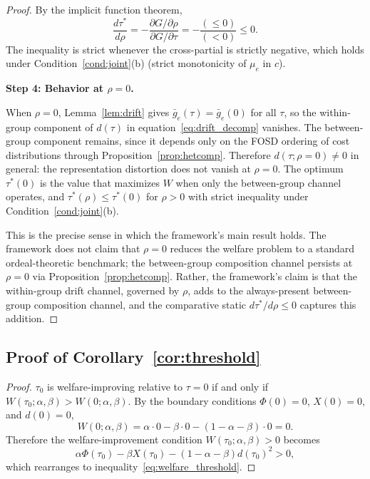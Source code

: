 \begin{proof}
By the implicit function theorem,
\[
\frac{d \tau^*}{d \rho} = -\frac{\partial G/\partial \rho}{\partial G/\partial \tau} = -\frac{(\leq 0)}{(<0)} \leq 0.
\]
The inequality is strict whenever the cross-partial is strictly negative, which holds under Condition~\ref{cond:joint}(b) (strict monotonicity of $\mu_e$ in $c$).

\textbf{Step 4: Behavior at $\rho = 0$.}

When $\rho = 0$, Lemma~\ref{lem:drift} gives $\bar g_e(\tau) = \bar g_e(0)$ for all $\tau$, so the within-group component of $d(\tau)$ in equation~\eqref{eq:drift_decomp} vanishes. The between-group component remains, since it depends only on the FOSD ordering of cost distributions through Proposition~\ref{prop:hetcomp}. Therefore $d(\tau; \rho = 0) \neq 0$ in general: the representation distortion does not vanish at $\rho = 0$. The optimum $\tau^*(0)$ is the value that maximizes $W$ when only the between-group channel operates, and $\tau^*(\rho) \leq \tau^*(0)$ for $\rho > 0$ with strict inequality under Condition~\ref{cond:joint}(b).

This is the precise sense in which the framework's main result holds. The framework does not claim that $\rho = 0$ reduces the welfare problem to a standard ordeal-theoretic benchmark; the between-group composition channel persists at $\rho = 0$ via Proposition~\ref{prop:hetcomp}. Rather, the framework's claim is that the within-group drift channel, governed by $\rho$, adds to the always-present between-group composition channel, and the comparative static $d\tau^*/d\rho \leq 0$ captures this addition.
\end{proof}

\subsection{Proof of Corollary~\ref{cor:threshold}}
\label{ssec:proof_threshold}

\begin{proof}
$\tau_0$ is welfare-improving relative to $\tau = 0$ if and only if $W(\tau_0; \alpha, \beta) > W(0; \alpha, \beta)$. By the boundary conditions $\Phi(0) = 0$, $X(0) = 0$, and $d(0) = 0$,
\[
W(0; \alpha, \beta) = \alpha \cdot 0 - \beta \cdot 0 - (1-\alpha-\beta) \cdot 0 = 0.
\]
Therefore the welfare-improvement condition $W(\tau_0; \alpha, \beta) > 0$ becomes
\[
\alpha \Phi(\tau_0) - \beta X(\tau_0) - (1 - \alpha - \beta) d(\tau_0)^2 > 0,
\]
which rearranges to inequality~\eqref{eq:welfare_threshold}.
\end{proof}

